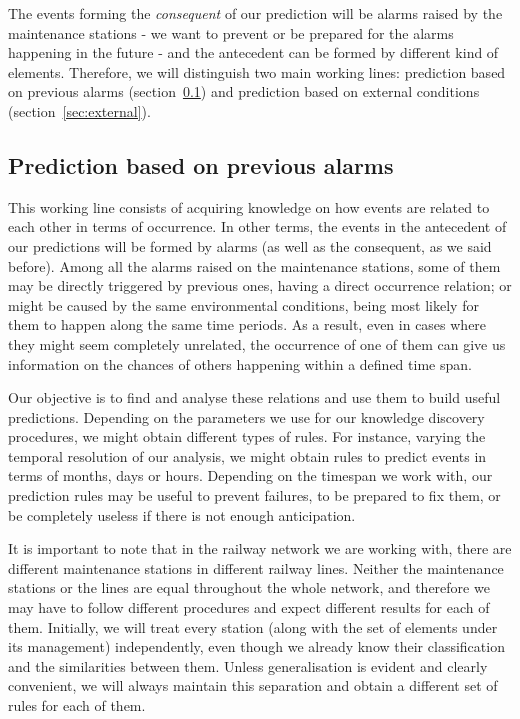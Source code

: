 The events forming the \emph{consequent} of our prediction will be alarms raised by the maintenance stations - we want to prevent or be prepared for the alarms happening in the future - and the antecedent can be formed by different kind of elements. Therefore, we will distinguish two main working lines: prediction based on previous alarms (section~\ref{sec:alarm-based-prediction}) and prediction based on external conditions (section~\ref{sec:external}).


\subsection{Prediction based on previous alarms}\label{sec:alarm-based-prediction}
This working line consists of acquiring knowledge on how events are related to each other in terms of occurrence. In other terms, the events in the antecedent of our predictions will be formed by alarms (as well as the consequent, as we said before). Among all the alarms raised on the maintenance stations, some of them may be directly triggered by previous ones, having a direct occurrence relation; or might be caused by the same environmental conditions, being most likely for them to happen along the same time periods. As a result, even in cases where they might seem completely unrelated, the occurrence of one of them can give us information on the chances of others happening within a defined time span.

Our objective is to find and analyse these relations and use them to build useful predictions. Depending on the parameters we use for our knowledge discovery procedures, we might obtain different types of rules. For instance, varying the temporal resolution of our analysis, we might obtain rules to predict events in terms of months, days or hours. Depending on the timespan we work with, our prediction rules may be useful to prevent failures, to be prepared to fix them, or be completely useless if there is not enough anticipation.

It is important to note that in the railway network we are working with, there are different maintenance stations in different railway lines. Neither the maintenance stations or the lines are equal throughout the whole network, and therefore we may have to follow different procedures and expect different results for each of them. Initially, we will treat every station (along with the set of elements under its management) independently, even though we already know their classification and the similarities between them. Unless generalisation is evident and clearly convenient, we will always maintain this separation and obtain a different set of rules for each of them.

